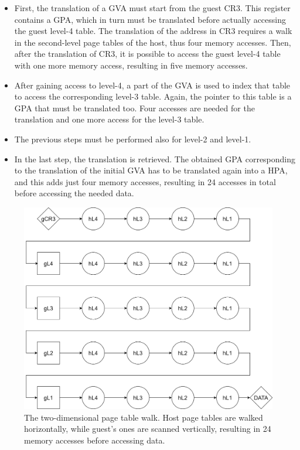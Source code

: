 \begin{itemize}
    \item First, the translation of a GVA must start from the guest CR3. This register contains a GPA, which in turn must be translated before actually accessing the guest level-4 table. The translation of the address in CR3 requires a walk in the second-level page tables of the host, thus four memory accesses. Then, after the translation of CR3, it is possible to access the guest level-4 table with one more memory access, resulting in five memory accesses.
    \item After gaining access to level-4, a part of the GVA is used to index that table to access the corresponding level-3 table. Again, the pointer to this table is a GPA that must be translated too. Four accesses are needed for the translation and one more access for the level-3 table. 
    \item The previous steps must be performed also for level-2 and level-1.
    \item In the last step, the translation is retrieved. The obtained GPA corresponding to the translation of the initial GVA has to be translated again into a HPA, and this adds just four memory accesses, resulting in 24 accesses in total before accessing the needed data.
\end{itemize}
\begin{figure}[t]
    \centering
    \includegraphics[scale=0.6]{images/two-dimensional-walk.png}
    \caption{The two-dimensional page table walk. Host page tables are walked horizontally, while guest's ones are scanned vertically, resulting in 24 memory accesses before accessing data.}
    \label{fig:intel-ept-translation}

\end{figure}
